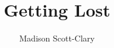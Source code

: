 \documentclass[12pt,letterpaper,oneside]{memoir}
\title{Getting Lost}
\author{Madison Scott-Clary}
\begin{document}
  \maketitle

  \newpage

  \tableofcontents

  \part{}

  
  
  
  
  

  \part{}

  
  
  
  
  
  
  
  
  

  \part{}
\end{document}
